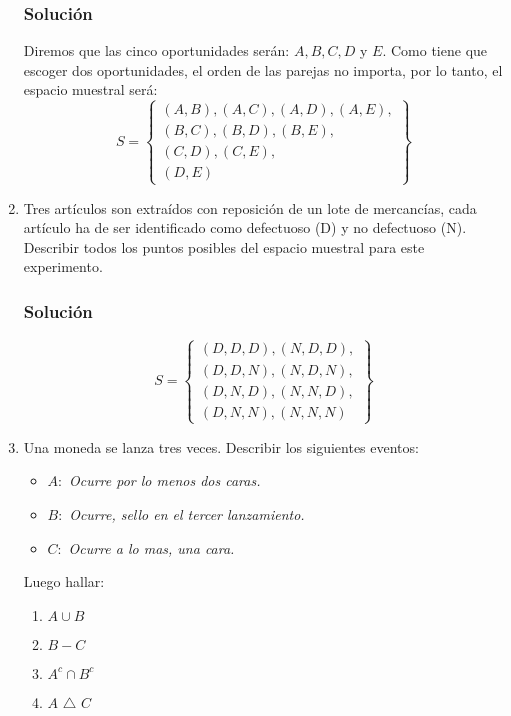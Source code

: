 \begin{enumerate}
\subsubsection{Solución}
Diremos que las cinco oportunidades serán: $A,B,C,D$ y $E$. Como tiene que escoger dos oportunidades, el orden de las parejas no importa, por lo tanto, el espacio muestral será:
\begin{equation*}
S=
\left\lbrace 
\begin{aligned}
(A,B),(A,C),(A,D),(A,E), \\
(B,C),(B,D),(B,E), \\
(C,D),(C,E), \\
(D,E)
\end{aligned}
\right\rbrace 
\end{equation*}
\item Tres artículos son extraídos con reposición de un lote de mercancías, cada artículo ha de ser identificado como defectuoso (D) y no defectuoso (N). Describir todos los puntos posibles del espacio muestral para este experimento.
\subsubsection{Solución}
\begin{equation*}
S=
\left\lbrace 
\begin{aligned}
(D,D,D),(N,D,D),\\
(D,D,N),(N,D,N),\\
(D,N,D),(N,N,D),\\
(D,N,N),(N,N,N)
\end{aligned}
\right\rbrace 
\end{equation*}
\item Una moneda se lanza tres veces. Describir los siguientes eventos:
\begin{itemize}
\item $A:$ \textit{Ocurre por lo menos dos caras.}
\item $B:$ \textit{Ocurre, sello en el tercer lanzamiento.}
\item $C:$ \textit{Ocurre a lo mas, una cara.}
\end{itemize}
Luego hallar:
\begin{enumerate}
\item $A\cup B$
\item $B-C$
\item $A^c \cap B^c$
\item $A$ {\footnotesize $\triangle$} $C$
\end{enumerate}

\end{enumerate}
